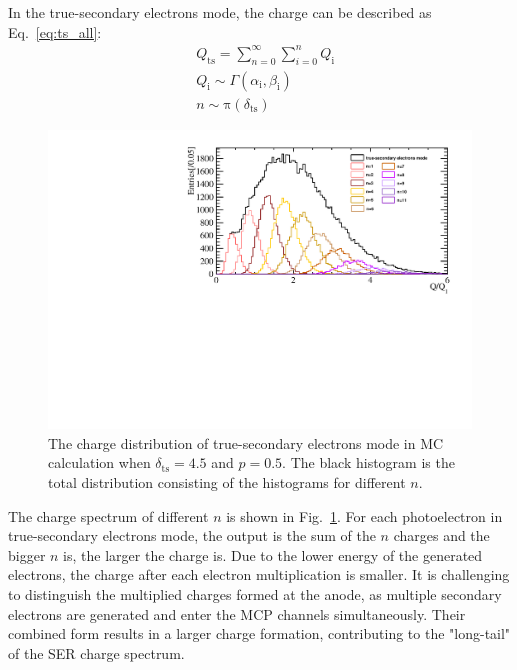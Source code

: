 In the true-secondary electrons mode, the charge can be described as Eq.~\eqref{eq:ts_all}:
\begin{equation}
    \label{eq:ts_all}
    \begin{aligned}
         & Q_{\mathrm{ts}} = \sum_{n=0}^{\infty} \sum_{i=0}^{n} Q_{\mathrm{i}}      \\
         & Q_{\mathrm{i}} \sim \varGamma  (\alpha_{\mathrm{i}}, \beta_{\mathrm{i}}) \\
         & n \sim \mathrm{\pi}(\delta_{\mathrm{ts}})
    \end{aligned}
\end{equation}
\begin{figure}[ht]
    \centering
    \includegraphics[width=0.6\linewidth]{pic/true_all.pdf}
    \caption{The charge distribution of true-secondary electrons mode in MC calculation when $\delta_{\mathrm{ts}}=4.5$ and $p=0.5$.
        The black histogram is the total distribution consisting of the histograms for different $n$.}\label{fig:true_n}
\end{figure}

The charge spectrum of different $n$ is shown in Fig.~\ref{fig:true_n}.
For each photoelectron in true-secondary electrons mode,
the output is the sum of the $n$ charges and the bigger $n$ is, the larger the charge is.
Due to the lower energy of the generated electrons,
the charge after each electron multiplication is smaller.
It is challenging to distinguish the multiplied charges formed at the anode,
as multiple secondary electrons are generated and enter the MCP channels simultaneously.
Their combined form results in a larger charge formation,
contributing to the "long-tail" of the SER charge spectrum.


